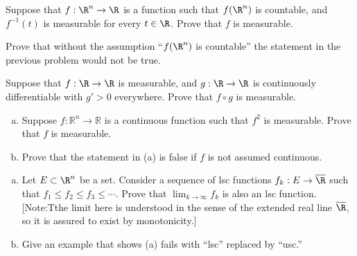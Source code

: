 


\begin{hw} \label{hw:15}
Suppose that $f: \R^n \to \R$ is a function such that $f(\R^n)$ is countable, and $f^{-1}(t)$ is measurable for every $t \in \R$. Prove that $f$ is measurable. \\
\end{hw}


\begin{hw} \label{hw:16}
Prove that without the assumption ``$f(\R^n)$ is countable'' the statement in the previous problem would not be true. \\
\end{hw}


\begin{hw} \label{hw:17}
Suppose that $f: \R \to \R$ is measurable, and $g: \R \to \R$ is continuously differentiable with $g' > 0$ everywhere. Prove that $f \circ g$ is measurable. \\
\end{hw}


\begin{hw} \label{hw:18}
\begin{enumerate}[(a)]
\item Suppose $f\colon \mathbb R^n\to\mathbb R$ is a continuous function such that $f^2$ is measurable. Prove that $f$ is measurable.
\item Prove that the statement in (a) is false if $f$ is not assumed continuous. \\
\end{enumerate}
\end{hw}






\begin{hw} \label{hw:19} \hfill
\begin{enumerate}[(a)]
\item Let $E \subset \R^n$ be a set. Consider a sequence of lsc functions $f_k: E \to \overline{\R}$ such that $f_1\leq f_2 \leq f_3 \leq \cdots$. Prove that $\lim_{k \to \infty} f_k$ is also an lsc function. [Note:Tthe limit here is understood in the sense of the extended real line $\overline{\R}$, so it is assured to exist by monotonicity.]
\item Give an example that shows (a) fails with ``lsc'' replaced by ``usc.'' \\
\end{enumerate}
\end{hw}


